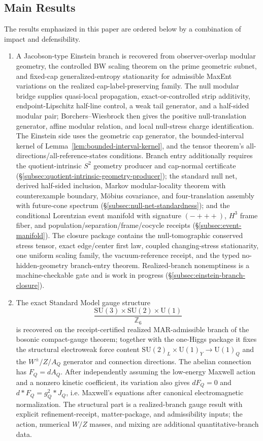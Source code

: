 \documentclass[11pt]{article}
\newcommand{\SU}{\mathrm{SU}}
\newcommand{\U}{\mathrm{U}}
\begin{document}
\subsection*{Main Results}

The results emphasized in this paper are ordered below by a combination of impact and defensibility.

\begin{enumerate}[leftmargin=2em]
\item A Jacobson-type Einstein branch is recovered from observer-overlap modular geometry, the controlled BW scaling theorem on the prime geometric subnet, and fixed-cap generalized-entropy stationarity for admissible MaxEnt variations on the realized cap-label-preserving family. The null modular bridge supplies quasi-local propagation, exact-or-controlled strip additivity, endpoint-Lipschitz half-line control, a weak tail generator, and a half-sided modular pair; Borchers--Wiesbrock then gives the positive null-translation generator, affine modular relation, and local null-stress charge identification. The Einstein side uses the geometric cap generator, the bounded-interval kernel of Lemma~\ref{lem:bounded-interval-kernel}, and the tensor theorem's all-directions/all-reference-states conditions. Branch entry additionally requires the quotient-intrinsic \(S^2\) geometry producer and cap-normal certificate (\S\ref{subsec:quotient-intrinsic-geometry-producer}); the standard null net, derived half-sided inclusion, Markov modular-locality theorem with counterexample boundary, M\"obius covariance, and four-translation assembly with future-cone spectrum (\S\ref{subsec:null-net-standardness}); and the conditional Lorentzian event manifold with signature \((-{+}{+}{+})\), \(H^3\) frame fiber, and population/separation/frame/cocycle receipts (\S\ref{subsec:event-manifold}). The closure package contains the null-tomographic conserved stress tensor, exact edge/center first law, coupled changing-stress stationarity, one uniform scaling family, the vacuum-reference receipt, and the typed no-hidden-geometry branch-entry theorem. Realized-branch nonemptiness is a machine-checkable gate and is work in progress (\S\ref{subsec:einstein-branch-closure}).
\item The exact Standard Model gauge structure
\[
\frac{\SU(3)\times\SU(2)\times\U(1)}{\mathbb Z_6}
\]
is recovered on the receipt-certified realized MAR-admissible branch of the bosonic compact-gauge theorem; together with the one-Higgs package it fixes the structural electroweak force content \(\SU(2)_L\times\U(1)_Y\to\U(1)_Q\) and the \(W^\pm/Z/A_Q\) generator and connection directions. The abelian connection has \(F_Q=dA_Q\). After independently assuming the low-energy Maxwell action and a nonzero kinetic coefficient, its variation also gives \(dF_Q=0\) and \(d*F_Q=g_Q^2*J_Q\), i.e. Maxwell's equations after canonical electromagnetic normalization. The structural part is a realized-branch gauge result with explicit refinement-receipt, matter-package, and admissibility inputs; the action, numerical \(W/Z\) masses, and mixing are additional quantitative-branch data.

\end{enumerate}
\end{document}
